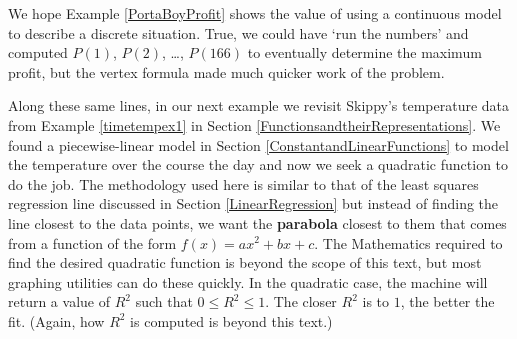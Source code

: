 \documentclass{ximera}
\begin{document}
We hope Example \ref{PortaBoyProfit}  shows the value of using a continuous model to describe a discrete situation.  True, we could have `run the numbers' and computed $P(1)$, $P(2)$, \ldots,  $P(166)$ to eventually determine the maximum profit, but the vertex formula made much quicker work of the problem.  

\medskip

Along these same lines, in our next example we revisit Skippy's temperature data from Example \ref{timetempex1} in Section \ref{FunctionsandtheirRepresentations}.  We found a piecewise-linear model in Section \ref{ConstantandLinearFunctions} to model the temperature over the course the day and now we seek a quadratic function to do the job.  The methodology used here is similar to that of the least squares regression line discussed in Section \ref{LinearRegression} but instead of finding the line closest to the data points, we want the \textbf{parabola} closest to them that comes from a function of the form $f(x) = ax^{2} + bx + c$.  The Mathematics required to find the desired quadratic function is beyond the scope of this text, but most graphing utilities can do these quickly.  In the quadratic case, the machine will return a value of $R^{2}$ such that $0 \leq R^{2} \leq 1$.  The closer $R^{2}$ is to $1$, the better the fit.  (Again, how $R^{2}$ is computed is beyond this text.)
\end{document}
